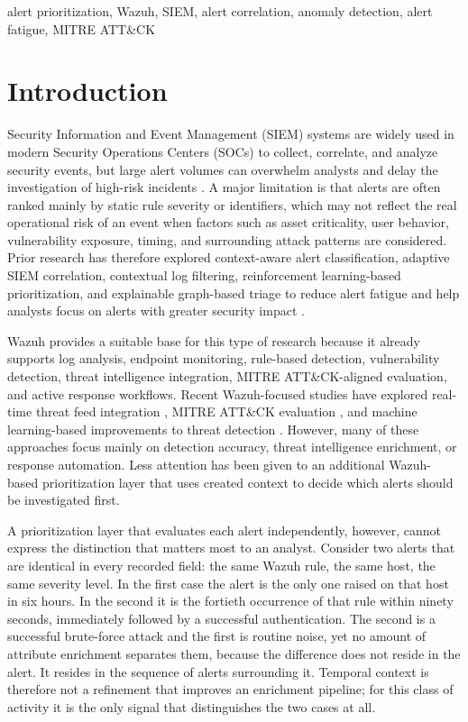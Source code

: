 \documentclass[conference]{IEEEtran}
\begin{document}
\begin{IEEEkeywords}
alert prioritization, Wazuh, SIEM, alert correlation, anomaly detection, alert fatigue, MITRE ATT\&CK
\end{IEEEkeywords}

\section{Introduction}

Security Information and Event Management (SIEM) systems are widely used in modern Security Operations Centers (SOCs) to collect, correlate, and analyze security events, but large alert volumes can overwhelm analysts and delay the investigation of high-risk incidents \cite{ref14}. A major limitation is that alerts are often ranked mainly by static rule severity or identifiers, which may not reflect the real operational risk of an event when factors such as asset criticality, user behavior, vulnerability exposure, timing, and surrounding attack patterns are considered. Prior research has therefore explored context-aware alert classification, adaptive SIEM correlation, contextual log filtering, reinforcement learning-based prioritization, and explainable graph-based triage to reduce alert fatigue and help analysts focus on alerts with greater security impact \cite{ref1,ref5,ref6,ref7,ref8}.

Wazuh provides a suitable base for this type of research because it already supports log analysis, endpoint monitoring, rule-based detection, vulnerability detection, threat intelligence integration, MITRE ATT\&CK-aligned evaluation, and active response workflows. Recent Wazuh-focused studies have explored real-time threat feed integration \cite{ref3}, MITRE ATT\&CK evaluation \cite{ref12}, and machine learning-based improvements to threat detection \cite{ref13}. However, many of these approaches focus mainly on detection accuracy, threat intelligence enrichment, or response automation. Less attention has been given to an additional Wazuh-based prioritization layer that uses created context to decide which alerts should be investigated first.

A prioritization layer that evaluates each alert independently, however, cannot express the distinction that matters most to an analyst. Consider two alerts that are identical in every recorded field: the same Wazuh rule, the same host, the same severity level. In the first case the alert is the only one raised on that host in six hours. In the second it is the fortieth occurrence of that rule within ninety seconds, immediately followed by a successful authentication. The second is a successful brute-force attack and the first is routine noise, yet no amount of attribute enrichment separates them, because the difference does not reside in the alert. It resides in the sequence of alerts surrounding it. Temporal context is therefore not a refinement that improves an enrichment pipeline; for this class of activity it is the only signal that distinguishes the two cases at all.
\end{document}
